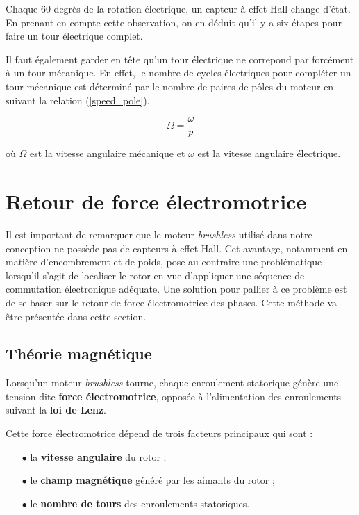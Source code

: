 		Chaque 60 degrès de la rotation électrique, un capteur à effet Hall
		change d'état. En prenant en compte cette observation, on en déduit
		qu'il y a six étapes pour faire un tour électrique complet.
		
		Il faut également garder en tête qu'un tour électrique
		ne correpond par forcément à un tour mécanique. En effet, le
		nombre de cycles électriques pour compléter un tour mécanique
		est déterminé par le nombre de paires de pôles du moteur en
		suivant la relation (\ref{speed_pole}).
		
		\begin{equation}
		\Omega=\frac{\omega}{p}
		\label{speed_pole}
		\end{equation}
		
		où $\Omega$ est la vitesse angulaire mécanique
		et $\omega$ est la vitesse angulaire électrique.
	
	\newpage
	
	\section{Retour de force électromotrice}
	
	Il est important de remarquer que le moteur \textit{brushless}
	utilisé dans notre conception ne possède pas de capteurs à 
	effet Hall. Cet avantage, notamment en matière d'encombrement
	et de poids, pose au contraire une problématique lorsqu'il
	s'agit de localiser le rotor en vue d'appliquer une séquence
	de commutation électronique adéquate. Une solution pour
	pallier à ce problème est de se baser sur le retour de force 
	électromotrice des phases. Cette méthode va être présentée
	dans cette section.
	
		\vspace{-1em}
	
		\subsection{Théorie magnétique}
		
		Lorsqu'un moteur \textit{brushless} tourne, chaque enroulement 
		statorique génère une tension dite \textbf{force électromotrice},
		opposée à l'alimentation des enroulements suivant la 
		\textbf{loi de Lenz}.
	
		Cette force électromotrice dépend de trois facteurs principaux
		qui sont :
		
		\begin{itemize}
			\item[$\bullet$] la \textbf{vitesse angulaire} du rotor ;
			\item[$\bullet$] le \textbf{champ magnétique} généré par les aimants du rotor ;
			\item[$\bullet$] le \textbf{nombre de tours} des enroulements statoriques.
		\end{itemize}
		
